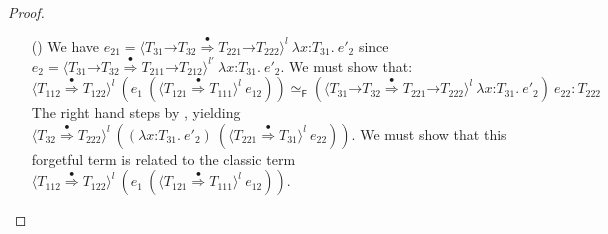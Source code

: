 \documentclass[9pt]{extarticle}
\newcommand{\ottnt}[1]{\mathit{#1}}
\newcommand{\ottsym}[1]{#1}
\begin{document}
{\begin{lemma}
\begin{proof}
{\begin{itemize}
\begin{itemize}
        finishes this case. So suppose both sides go to values
        $ \ottnt{e''_{{\mathrm{12}}}}   \sim _{  \mathsf{F}  }  \ottnt{e''_{{\mathrm{22}}}}  :  \ottnt{T_{{\mathrm{212}}}} $. By the IH, we know that
        $  \langle  \ottnt{T_{{\mathrm{112}}}}  \mathord{ \overset{\bullet}{\Rightarrow} }  \ottnt{T_{{\mathrm{122}}}}  \rangle^{ \ottnt{l} } ~  \ottnt{e''_{{\mathrm{12}}}}    \simeq _{  \mathsf{F}  }   \langle  \ottnt{T_{{\mathrm{212}}}}  \mathord{ \overset{\bullet}{\Rightarrow} }  \ottnt{T_{{\mathrm{222}}}}  \rangle^{ \ottnt{l} } ~  \ottnt{e''_{{\mathrm{22}}}}   :  \ottnt{T_{{\mathrm{222}}}} $, and
        we are done.

      \item[(\E{CastMerge})] We have $\ottnt{e_{{\mathrm{21}}}}  \ottsym{=}   \langle   \ottnt{T_{{\mathrm{31}}}} \mathord{ \rightarrow } \ottnt{T_{{\mathrm{32}}}}   \mathord{ \overset{\bullet}{\Rightarrow} }   \ottnt{T_{{\mathrm{221}}}} \mathord{ \rightarrow } \ottnt{T_{{\mathrm{222}}}}   \rangle^{ \ottnt{l} } ~   \lambda \mathit{x} \mathord{:} \ottnt{T_{{\mathrm{31}}}} .~  \ottnt{e'_{{\mathrm{2}}}}  $ since $\ottnt{e_{{\mathrm{2}}}}  \ottsym{=}   \langle   \ottnt{T_{{\mathrm{31}}}} \mathord{ \rightarrow } \ottnt{T_{{\mathrm{32}}}}   \mathord{ \overset{\bullet}{\Rightarrow} }   \ottnt{T_{{\mathrm{211}}}} \mathord{ \rightarrow } \ottnt{T_{{\mathrm{212}}}}   \rangle^{ \ottnt{l'} } ~   \lambda \mathit{x} \mathord{:} \ottnt{T_{{\mathrm{31}}}} .~  \ottnt{e'_{{\mathrm{2}}}}  $.
We must show that:
\[   \langle  \ottnt{T_{{\mathrm{112}}}}  \mathord{ \overset{\bullet}{\Rightarrow} }  \ottnt{T_{{\mathrm{122}}}}  \rangle^{ \ottnt{l} } ~   (  \ottnt{e_{{\mathrm{1}}}} ~  (  \langle  \ottnt{T_{{\mathrm{121}}}}  \mathord{ \overset{\bullet}{\Rightarrow} }  \ottnt{T_{{\mathrm{111}}}}  \rangle^{ \ottnt{l} } ~  \ottnt{e_{{\mathrm{12}}}}  )   )     \simeq _{  \mathsf{F}  }    (  \langle   \ottnt{T_{{\mathrm{31}}}} \mathord{ \rightarrow } \ottnt{T_{{\mathrm{32}}}}   \mathord{ \overset{\bullet}{\Rightarrow} }   \ottnt{T_{{\mathrm{221}}}} \mathord{ \rightarrow } \ottnt{T_{{\mathrm{222}}}}   \rangle^{ \ottnt{l} } ~   \lambda \mathit{x} \mathord{:} \ottnt{T_{{\mathrm{31}}}} .~  \ottnt{e'_{{\mathrm{2}}}}   )  ~ \ottnt{e_{{\mathrm{22}}}}   :  \ottnt{T_{{\mathrm{222}}}}  \]
The right hand steps by ,
        yielding $ \langle  \ottnt{T_{{\mathrm{32}}}}  \mathord{ \overset{\bullet}{\Rightarrow} }  \ottnt{T_{{\mathrm{222}}}}  \rangle^{ \ottnt{l} } ~   (   (  \lambda \mathit{x} \mathord{:} \ottnt{T_{{\mathrm{31}}}} .~  \ottnt{e'_{{\mathrm{2}}}}  )  ~  (  \langle  \ottnt{T_{{\mathrm{221}}}}  \mathord{ \overset{\bullet}{\Rightarrow} }  \ottnt{T_{{\mathrm{31}}}}  \rangle^{ \ottnt{l} } ~  \ottnt{e_{{\mathrm{22}}}}  )   )  $. We must show that this forgetful term is related to
        the classic term $ \langle  \ottnt{T_{{\mathrm{112}}}}  \mathord{ \overset{\bullet}{\Rightarrow} }  \ottnt{T_{{\mathrm{122}}}}  \rangle^{ \ottnt{l} } ~   (  \ottnt{e_{{\mathrm{1}}}} ~  (  \langle  \ottnt{T_{{\mathrm{121}}}}  \mathord{ \overset{\bullet}{\Rightarrow} }  \ottnt{T_{{\mathrm{111}}}}  \rangle^{ \ottnt{l} } ~  \ottnt{e_{{\mathrm{12}}}}  )   )  $.


\end{itemize}
\end{itemize}}
\end{proof}
\end{lemma}}
\end{document}
